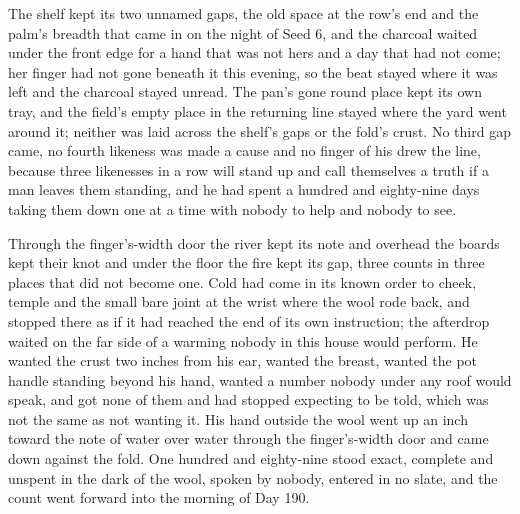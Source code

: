 The shelf kept its two unnamed gaps, the old space at the row's end and the palm's breadth that came in on the night of Seed 6, and the charcoal waited under the front edge for a hand that was not hers and a day that had not come; her finger had not gone beneath it this evening, so the beat stayed where it was left and the charcoal stayed unread. The pan's gone round place kept its own tray, and the field's empty place in the returning line stayed where the yard went around it; neither was laid across the shelf's gaps or the fold's crust. No third gap came, no fourth likeness was made a cause and no finger of his drew the line, because three likenesses in a row will stand up and call themselves a truth if a man leaves them standing, and he had spent a hundred and eighty-nine days taking them down one at a time with nobody to help and nobody to see.

Through the finger's-width door the river kept its note and overhead the boards kept their knot and under the floor the fire kept its gap, three counts in three places that did not become one. Cold had come in its known order to cheek, temple and the small bare joint at the wrist where the wool rode back, and stopped there as if it had reached the end of its own instruction; the afterdrop waited on the far side of a warming nobody in this house would perform. He wanted the crust two inches from his ear, wanted the breast, wanted the pot handle standing beyond his hand, wanted a number nobody under any roof would speak, and got none of them and had stopped expecting to be told, which was not the same as not wanting it. His hand outside the wool went up an inch toward the note of water over water through the finger's-width door and came down against the fold. One hundred and eighty-nine stood exact, complete and unspent in the dark of the wool, spoken by nobody, entered in no slate, and the count went forward into the morning of Day 190.

